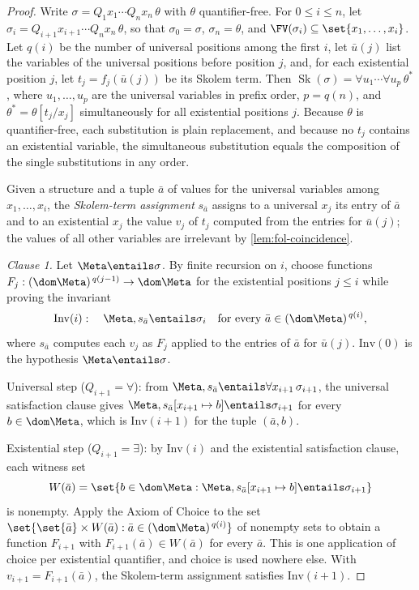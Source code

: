 \begin{proof}
Write \(\sigma=Q_1x_1\cdots Q_nx_n\,\theta\) with \(\theta\)
quantifier-free.  For \(0\le i\le n\), let
\(\sigma_i=Q_{i+1}x_{i+1}\cdots Q_nx_n\,\theta\), so that
\(\sigma_0=\sigma\), \(\sigma_n=\theta\), and
\(\FV(\sigma_i)\subseteq\set{x_1,\ldots,x_i}\).  Let \(q(i)\) be the
number of universal positions among the first \(i\), let \(\bar u(j)\)
list the variables of the universal positions before position \(j\), and,
for each existential position \(j\), let \(t_j=f_j(\bar u(j))\) be its
Skolem term.  Then
\(\operatorname{Sk}(\sigma)=\forall u_1\cdots\forall u_p\,\theta^{*}\),
where \(u_1,\ldots,u_p\) are the universal variables in prefix order,
\(p=q(n)\), and \(\theta^{*}=\theta[t_j/x_j]\) simultaneously for all
existential positions \(j\).  Because \(\theta\) is quantifier-free, each
substitution is plain replacement, and because no \(t_j\) contains an
existential variable, the simultaneous substitution equals the
composition of the single substitutions in any order.

Given a structure and a tuple \(\bar a\) of values for the universal
variables among \(x_1,\ldots,x_i\), the \emph{Skolem-term assignment}
\(s_{\bar a}\) assigns to a universal \(x_j\) its entry of \(\bar a\) and
to an existential \(x_j\) the value \(v_j\) of \(t_j\) computed from the
entries for \(\bar u(j)\); the values of all other variables are
irrelevant by \cref{lem:fol-coincidence}.

\emph{Clause 1.}  Let \(\Meta\entails\sigma\).  By finite recursion on
\(i\), choose functions
\(F_j:(\dom\Meta)^{\,q(j-1)}\to\dom\Meta\) for the existential
positions \(j\le i\) while proving the invariant
\[
 \mathrm{Inv}(i):\quad
 \Meta,s_{\bar a}\entails\sigma_i
 \quad\text{for every }\bar a\in(\dom\Meta)^{\,q(i)},
\]
where \(s_{\bar a}\) computes each \(v_j\) as
\(F_j\) applied to the entries of \(\bar a\) for \(\bar u(j)\).
\(\mathrm{Inv}(0)\) is the hypothesis \(\Meta\entails\sigma\).

Universal step (\(Q_{i+1}=\forall\)): from
\(\Meta,s_{\bar a}\entails\forall x_{i+1}\,\sigma_{i+1}\), the universal
satisfaction clause gives
\(\Meta,s_{\bar a}[x_{i+1}\mapsto b]\entails\sigma_{i+1}\) for every
\(b\in\dom\Meta\), which is \(\mathrm{Inv}(i+1)\) for the tuple
\((\bar a,b)\).

Existential step (\(Q_{i+1}=\exists\)): by \(\mathrm{Inv}(i)\) and the
existential satisfaction clause, each witness set
\[
 W(\bar a)=\set{b\in\dom\Meta:
 \Meta,s_{\bar a}[x_{i+1}\mapsto b]\entails\sigma_{i+1}}
\]
is nonempty.  Apply the Axiom of Choice to the set
\(\set{\set{\bar a}\times W(\bar a):\bar a\in(\dom\Meta)^{\,q(i)}}\) of
nonempty sets to obtain a function \(F_{i+1}\) with
\(F_{i+1}(\bar a)\in W(\bar a)\) for every \(\bar a\).  This is one
application of choice per existential quantifier, and choice is used
nowhere else.  With \(v_{i+1}=F_{i+1}(\bar a)\), the Skolem-term
assignment satisfies \(\mathrm{Inv}(i+1)\).


\end{proof}
